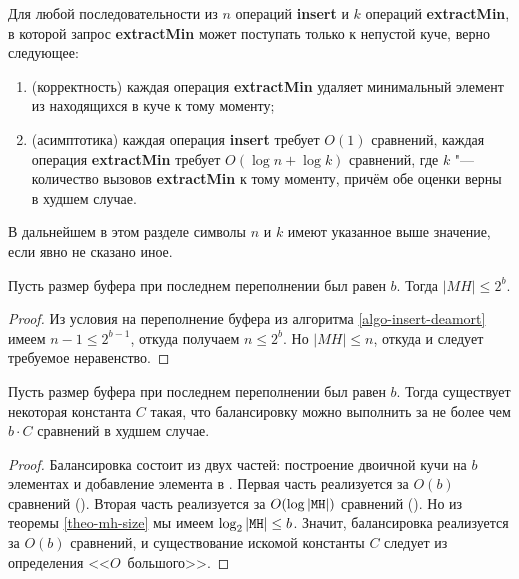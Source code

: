 \begin{theorem} \label{theo-fast-correct}
Для любой последовательности из
$n$ операций \textbf{insert} и $k$ операций \textbf{extractMin},
в которой запрос \textbf{extractMin} может поступать только к непустой
куче, верно следующее:
\begin{enumerate}
\item (корректность) каждая операция \textbf{extractMin} удаляет минимальный элемент
из находящихся в куче к тому моменту;
\item (асимптотика) каждая операция \textbf{insert} требует $O(1)$ сравнений,
каждая операция \textbf{extractMin} требует $O(\log n + \log k)$ сравнений,
где $k$ "--- количество вызовов \textbf{extractMin} к тому моменту, причём
обе оценки верны в худшем случае.
\end{enumerate}
\end{theorem}

\bigskip

В дальнейшем в этом разделе символы $n$ и $k$ имеют указанное выше значение,
если явно не сказано иное.

\begin{lem} \label{theo-mh-size}
Пусть размер буфера при последнем переполнении был равен $b$. Тогда $|MH| \leq 2^b$.
\end{lem}
\begin{proof}
Из условия на переполнение буфера из алгоритма \ref{algo-insert-deamort} имеем
$n-1 \leq 2^{b-1}$, откуда получаем $n \leq 2^b$. Но $|MH| \leq n$, откуда
и следует требуемое неравенство.
\end{proof}

\begin{lem}\label{theo-balancing-constant}
Пусть размер буфера при последнем переполнении был равен $b$.
Тогда существует некоторая константа $C$ такая,
что балансировку можно выполнить за не более чем $b\cdot C$ сравнений в худшем случае.
\end{lem}
\begin{proof}
Балансировка состоит из двух частей: построение двоичной кучи на $b$ элементах
и добавление элемента в \MH. Первая часть реализуется за $O(b)$ сравнений
(\cite[с.~181]{Cormen}).
Вторая часть реализуется за $O(\log |\MH|)$ сравнений (\cite[с.~181]{Cormen}). Но из
теоремы \ref{theo-mh-size} мы имеем $\log_2 |\MH| \leq b$. Значит, балансировка
реализуется за $O(b)$ сравнений, и существование искомой константы $C$ следует
из определения <<$O$~большого>>.
\end{proof}

